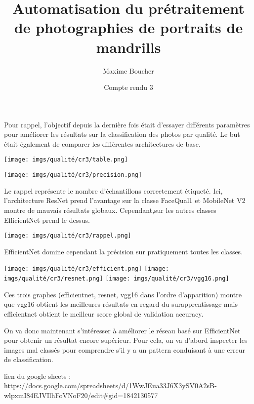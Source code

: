 \documentclass{article}
\title{Automatisation du prétraitement de photographies de portraits de mandrills}
\author{Maxime Boucher}
\date{Compte rendu 3}
\begin{document}
\maketitle

Pour rappel, l'objectif depuis la dernière fois était d'essayer différents paramètres pour améliorer les résultats sur la classification des photos par qualité. Le but était également de comparer les différentes architectures de base.

\begin{center}
    \texttt{[image: imgs/qualité/cr3/table.png]}
\end{center}

\begin{center}
    \texttt{[image: imgs/qualité/cr3/precision.png]}
\end{center}
    
Le rappel représente le nombre d'échantillons correctement étiqueté. Ici, l'architecture ResNet prend l'avantage sur la classe FaceQual1 et MobileNet V2 montre de mauvais résultats globaux. Cependant,sur les autres classes EfficientNet prend le dessus.

\begin{center}
    \texttt{[image: imgs/qualité/cr3/rappel.png]}
\end{center}

EfficientNet domine cependant la précision sur pratiquement toutes les classes.

\begin{center}
    \texttt{[image: imgs/qualité/cr3/efficient.png]}
    \texttt{[image: imgs/qualité/cr3/resnet.png]}
    \texttt{[image: imgs/qualité/cr3/vgg16.png]}
\end{center}

Ces trois graphes (efficientnet, resnet, vgg16 dans l'ordre d'apparition) montre que vgg16 obtient les meilleures résultats en regard du surapprentissage mais efficientnet obtient le meilleur score global de validation accuracy.

On va donc maintenant s'intéresser à améliorer le réseau basé sur EfficientNet pour obtenir un résultat encore supérieur. Pour cela, on va d'abord inspecter les images mal classés pour comprendre s'il y a un pattern conduisant à une erreur de classification.

lien du google sheets : https://docs.google.com/spreadsheets/d/1WwJEua33J6X3ySV0A2sB-wlpxmI84EJVIlhFoVNoF20/edit#gid=1842130577
\end{document}
